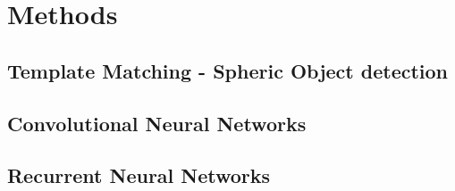 \documentclass[main.tex]{subfiles}
\begin{document}
\chapter{Methods}
\section{Template Matching - Spheric Object detection}
\section{Convolutional Neural Networks}
\section{Recurrent Neural Networks}
\end{document}
